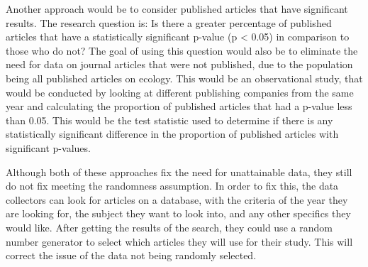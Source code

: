\documentclass[
]{article}
\begin{document}
Another approach would be to consider published articles that have
significant results. The research question is: Is there a greater
percentage of published articles that have a statistically significant
p-value (p \textless{} 0.05) in comparison to those who do not? The goal
of using this question would also be to eliminate the need for data on
journal articles that were not published, due to the population being
all published articles on ecology. This would be an observational study,
that would be conducted by looking at different publishing companies
from the same year and calculating the proportion of published articles
that had a p-value less than 0.05. This would be the test statistic used
to determine if there is any statistically significant difference in the
proportion of published articles with significant p-values.

Although both of these approaches fix the need for unattainable data,
they still do not fix meeting the randomness assumption. In order to fix
this, the data collectors can look for articles on a database, with the
criteria of the year they are looking for, the subject they want to look
into, and any other specifics they would like. After getting the results
of the search, they could use a random number generator to select which
articles they will use for their study. This will correct the issue of
the data not being randomly selected.
\end{document}
